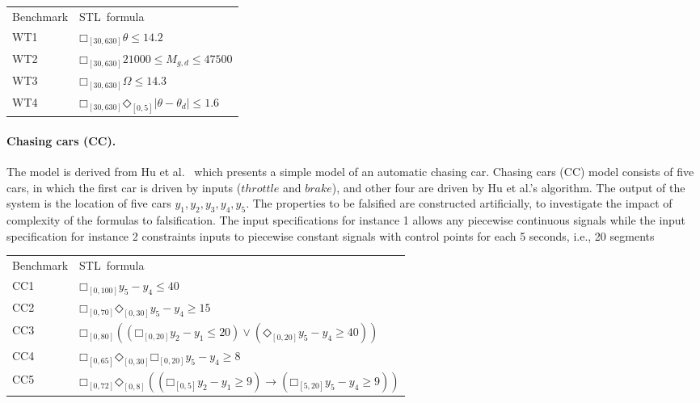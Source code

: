 \documentclass[a4paper]{easychair}
\newcommand{\falsify}{falsify\xspace}
\begin{document}
	\begin{tabular}{ll}
		\toprule
		Benchmark & STL~formula \\
		\cmidrule(r){1-1} \cmidrule(l){2-2}
		WT1  & $□_{[30, 630]} \theta \leq 14.2$ \\
		WT2  & $□_{[30, 630]} 21000 \leq M_{g, d} \leq 47500$ \\
		WT3 &  $□_{[30, 630]} \Omega \leq 14.3$ \\
		WT4 &  $□_{[30, 630]} ◇_{[0,5]} |\theta - \theta_d| \leq 1.6$ \\
		\bottomrule
	\end{tabular}


	\paragraph{Chasing cars (CC).}

	The model is derived from Hu et al.~\cite{hu2000towards} which
    presents a simple model of an automatic chasing car.  Chasing cars
    (CC) model consists of five cars, in which the first car is driven
    by inputs ($\mathit{throttle}$ and $\mathit{brake}$), and other
    four are driven by Hu et al.'s algorithm.  The output of the
    system is the location of five cars $y_1, y_2, y_3, y_4, y_5$.
    The properties to be falsified are constructed artificially, to
    investigate the impact of complexity of the formulas to
    falsification.  The input specifications for instance 1 allows any
    piecewise continuous signals while the input specification for
    instance 2 constraints inputs to piecewise constant signals with
    control points for each 5 seconds, i.e., 20 segments

	\begin{tabular}{ll}
		\toprule
		Benchmark & STL~formula \\
		\cmidrule(r){1-1} \cmidrule(l){2-2}
		CC1  & $□_{[0, 100]} y_5 - y_4 \leq 40$ \\
		CC2  & $□_{[0, 70]} ◇_{[0,30]} y_5 - y_4 \geq 15$ \\
		CC3 &  $□_{[0, 80]} ((□_{[0,20]}y_2 - y_1 \leq 20) \lor (◇_{[0,20]} y_5 - y_4 \geq 40))$ \\
		CC4 &  $□_{[0, 65]} ◇_{[0,30]} □_{[0,20]} y_5 - y_4 \geq 8$ \\
		CC5 &  $□_{[0, 72]} ◇_{[0,8]} ((□_{[0,5]} y_2 - y_1 \geq 9) \to (□_{[5, 20]} y_5 - y_4 \geq 9))$\\
		\bottomrule
	\end{tabular}
\end{document}
